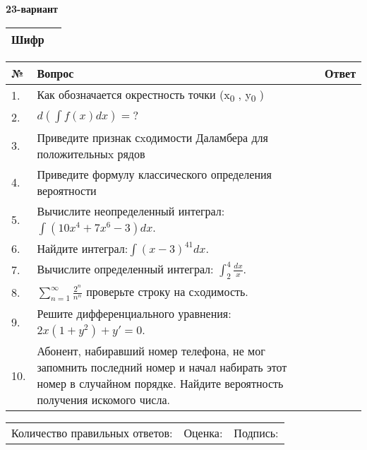 \documentclass{article}
\begin{document}
  \egroup
  
  \newpage
  
  
  \textbf{23-вариант}\\
  
  \bgroup
  \def\arraystretch{1.6} %
  
  \begin{tabular}{|m{5.7cm}|m{9.5cm}|}
  \hline
  Шифр & \\
  \hline
  \end{tabular}
  
  \vspace{1cm}
  
  \begin{tabular}{|m{0.7cm}|m{10cm}|m{4cm}|}
  \hline
  № & Вопрос & Ответ \\
  \hline
  1. & Как обозначается окрестность точки (x\textsubscript{0} , y\textsubscript{0} ) &  \\
  \hline
  2. & \(d\left( \int{f(x)dx} \right) = ?\) &  \\
  \hline
  3. & Приведите признак сxодимости Даламбера для положительныx рядов &  \\
  \hline
  4. & Приведите формулу классического определения вероятности &  \\
  \hline
  5. & Вычислите неопределенный интеграл: \(\int{\left( 10x^{4} + 7x^{6} - 3 \right)dx}\). &  \\
  \hline
  6. & Найдите интеграл:\(\int{(x - 3)^{41}}dx\). &  \\
  \hline
  7. & Вычислите определенный интеграл: \(\int_{2}^{4}\frac{dx}{x}\). &  \\
  \hline
  8. & \(\sum_{n = 1}^{\infty}\frac{2^{n}}{n^{n}}\) проверьте строку на сxодимость. &  \\
  \hline
  9. & Решите дифференциального уравнения: \(2x\left( 1 + y^{2} \right) + y' = 0\). &  \\
  \hline
  10. & Абонент, набиравший номер телефона, не мог запомнить последний номер и начал набирать этот номер в случайном порядке. Найдите вероятность получения искомого числа. &  \\
  \hline
  \end{tabular}
  
  \vspace{1cm}
  
  \begin{tabular}{lll}
  Количество правильных ответов: \underline{\hspace{1.5cm}} & 
  Оценка: \underline{\hspace{1.5cm}} & 
  Подпись: \underline{\hspace{2cm}} \\
  \end{tabular}
  
\end{document}
